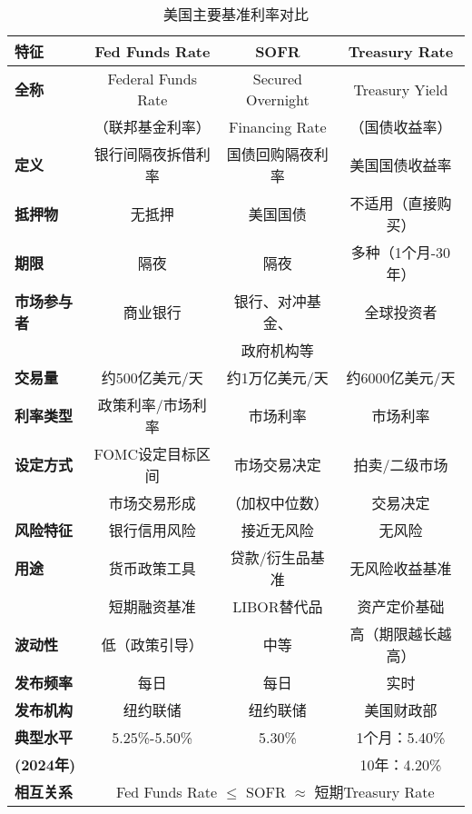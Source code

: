 \begin{table}[h]
\centering
\caption{美国主要基准利率对比}
\begin{tabular}{|l|c|c|c|}
\hline
\textbf{特征} & \textbf{Fed Funds Rate} & \textbf{SOFR} & \textbf{Treasury Rate} \\
\hline
\hline
\textbf{全称} & Federal Funds Rate & Secured Overnight & Treasury Yield \\
 & （联邦基金利率） & Financing Rate & （国债收益率） \\
\hline
\textbf{定义} & 银行间隔夜拆借利率 & 国债回购隔夜利率 & 美国国债收益率 \\
\hline
\textbf{抵押物} & 无抵押 & 美国国债 & 不适用（直接购买） \\
\hline
\textbf{期限} & 隔夜 & 隔夜 & 多种（1个月-30年） \\
\hline
\textbf{市场参与者} & 商业银行 & 银行、对冲基金、 & 全球投资者 \\
 &  & 政府机构等 &  \\
\hline
\textbf{交易量} & 约500亿美元/天 & 约1万亿美元/天 & 约6000亿美元/天 \\
\hline
\textbf{利率类型} & 政策利率/市场利率 & 市场利率 & 市场利率 \\
\hline
\textbf{设定方式} & FOMC设定目标区间 & 市场交易决定 & 拍卖/二级市场 \\
 & 市场交易形成 & （加权中位数） & 交易决定 \\
\hline
\textbf{风险特征} & 银行信用风险 & 接近无风险 & 无风险 \\
\hline
\textbf{用途} & 货币政策工具 & 贷款/衍生品基准 & 无风险收益基准 \\
 & 短期融资基准 & LIBOR替代品 & 资产定价基础 \\
\hline
\textbf{波动性} & 低（政策引导） & 中等 & 高（期限越长越高） \\
\hline
\textbf{发布频率} & 每日 & 每日 & 实时 \\
\hline
\textbf{发布机构} & 纽约联储 & 纽约联储 & 美国财政部 \\
\hline
\hline
\textbf{典型水平} & 5.25\%-5.50\% & 5.30\% & 1个月：5.40\% \\
\textbf{(2024年)} &  &  & 10年：4.20\% \\
\hline
\textbf{相互关系} & \multicolumn{3}{c|}{Fed Funds Rate $\leq$ SOFR $\approx$ 短期Treasury Rate} \\
\hline
\end{tabular}
\end{table}

